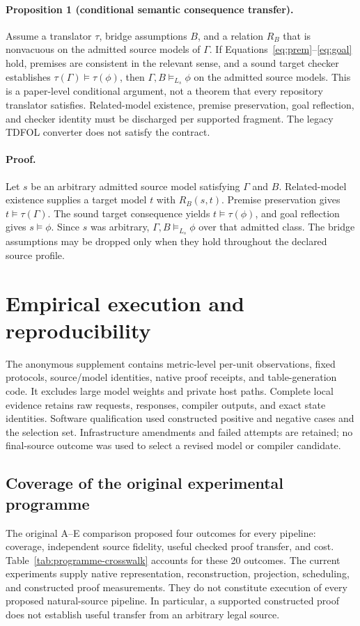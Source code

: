 \documentclass{article}
\begin{document}
\paragraph{Proposition 1 (conditional semantic consequence transfer).}
\label{prop:transfer}
Assume a translator $\tau$, bridge assumptions $B$, and a relation $R_B$ that is nonvacuous on the admitted source models of $\Gamma$. If Equations~\ref{eq:prem}--\ref{eq:goal} hold, premises are consistent in the relevant sense, and a sound target checker establishes $\tau(\Gamma)\models\tau(\phi)$, then $\Gamma,B\models_{L_s}\phi$ on the admitted source models.
This is a paper-level conditional argument, not a theorem that every repository translator satisfies. Related-model existence, premise preservation, goal reflection, and checker identity must be discharged per supported fragment. The legacy TDFOL converter does not satisfy the contract.
\paragraph{Proof.} Let $s$ be an arbitrary admitted source model satisfying $\Gamma$ and $B$. Related-model existence supplies a target model $t$ with $R_B(s,t)$. Premise preservation gives $t\models\tau(\Gamma)$. The sound target consequence yields $t\models\tau(\phi)$, and goal reflection gives $s\models\phi$. Since $s$ was arbitrary, $\Gamma,B\models_{L_s}\phi$ over that admitted class. The bridge assumptions may be dropped only when they hold throughout the declared source profile.



\section{Empirical execution and reproducibility}

The anonymous supplement contains metric-level per-unit observations, fixed protocols, source/model identities, native proof receipts, and table-generation code. It excludes large model weights and private host paths. Complete local evidence retains raw requests, responses, compiler outputs, and exact state identities. Software qualification used constructed positive and negative cases and the selection set. Infrastructure amendments and failed attempts are retained; no final-source outcome was used to select a revised model or compiler candidate.

\subsection{Coverage of the original experimental programme}
The original A--E comparison proposed four outcomes for every pipeline: coverage, independent source fidelity, useful checked proof transfer, and cost. Table~\ref{tab:programme-crosswalk} accounts for these 20 outcomes. The current experiments supply native representation, reconstruction, projection, scheduling, and constructed proof measurements. They do not constitute execution of every proposed natural-source pipeline. In particular, a supported constructed proof does not establish useful transfer from an arbitrary legal source.
\end{document}
